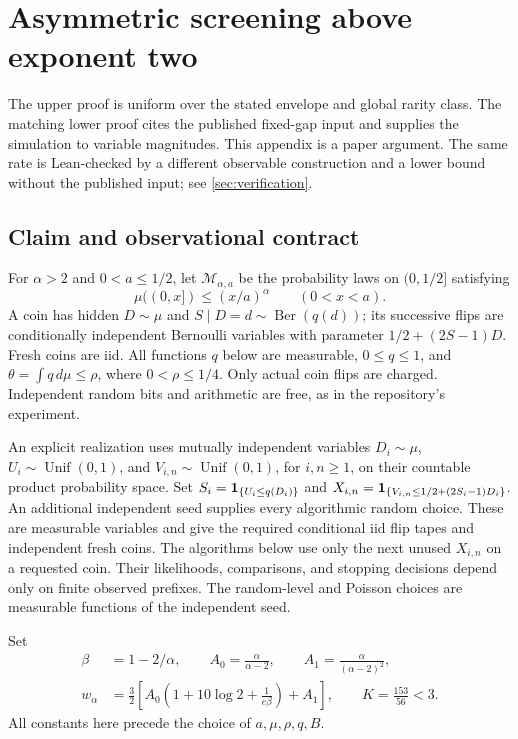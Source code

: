 \section{Asymmetric screening above exponent two}\label{app:above-two}
The upper proof is uniform over the stated envelope and global rarity
class. The matching lower proof cites the published fixed-gap input
and supplies the simulation to variable magnitudes. This appendix
is a paper argument. The same rate is Lean-checked by a different
observable construction and a lower bound without the published
input; see \cref{sec:verification}.

\subsection{Claim and observational contract}
For $\alpha>2$ and $0<a\le 1/2$, let $\mathcal M_{\alpha,a}$ be the probability
laws on $(0,1/2]$ satisfying
\[
 \mu((0,x])\le (x/a)^\alpha\qquad (0<x<a).
\]
A coin has hidden $D\sim\mu$ and $S\mid D=d\sim\operatorname{Ber}(q(d))$;
its successive flips are conditionally independent Bernoulli variables with
parameter $1/2+(2S-1)D$. Fresh coins are iid. All functions $q$ below are measurable,
$0\le q\le1$, and $\theta=\int q\,d\mu\le\rho$, where $0<\rho\le1/4$.
Only actual coin flips are charged. Independent random bits and arithmetic are
free, as in the repository's experiment.

An explicit realization uses mutually independent variables $D_i\sim\mu$,
$U_i\sim\operatorname{Unif}(0,1)$, and $V_{i,n}\sim\operatorname{Unif}(0,1)$,
for $i,n\ge1$, on their countable product probability space. Set
$S_i=\mathbf 1_{\{U_i\le q(D_i)\}}$ and
$X_{i,n}=\mathbf 1_{\{V_{i,n}\le1/2+(2S_i-1)D_i\}}$.
An additional independent seed supplies every algorithmic random choice.
These are measurable variables and give the required conditional iid flip
tapes and independent fresh coins. The algorithms below use only the next
unused $X_{i,n}$ on a requested coin. Their likelihoods, comparisons, and
stopping decisions depend only on finite observed prefixes. The random-level
and Poisson choices are measurable functions of the independent seed.

Set
\[
\begin{aligned}
 \beta&=1-2/\alpha,\qquad A_0=\frac{\alpha}{\alpha-2},\qquad
 A_1=\frac{\alpha}{(\alpha-2)^2},\\
 w_\alpha&=\frac32\left[
 A_0\left(1+10\log2+\frac1{e\beta}\right)+A_1\right],
 \qquad K=\frac{153}{56}<3.
\end{aligned}
\]
All constants here precede the choice of $a,\mu,\rho,q,B$.

